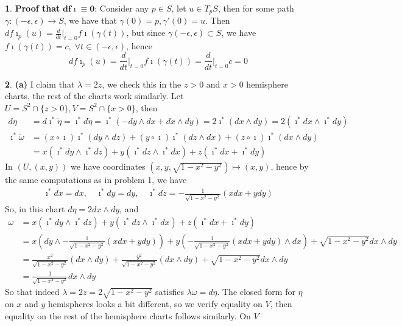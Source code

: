 \documentclass[10.5pt]{article}
\theoremstyle{definition}
\newtheorem{pb}{}
\newcommand{\set}[1]{\{#1\}}
\newcommand{\tand}{\text{ and }}
\newcommand{\z}{\imath}
\begin{document}
\begin{pb}
        \textbf{Proof that} \(\mathbf{df\z \equiv 0}\): Consider any \(p \in S\), let \(u \in T_pS\), then for some path \(\gamma: (-\epsilon,\epsilon) \to S\), we have that \(\gamma(0) = p, \gamma'(0) = u\). Then \(df\z_p(u) = \frac{d}{dt}\vert_{t=0}f\z(\gamma(t))\), but since \(\gamma(-\epsilon,\epsilon) \subset S\), we have \(f\z(\gamma(t)) = c, \; \forall t \in (-\epsilon,\epsilon)\), hence
        \[df\z_p(u) = \frac{d}{dt}\vert_{t=0}f\z(\gamma(t)) = \frac{d}{dt}\vert_{t=0} c = 0\]
    \end{pb}
    \begin{pb}
        \textbf{(a)}
        I claim that \(\lambda = 2z\), we check this in the \(z > 0 \tand x > 0\) hemisphere charts, the rest of the charts work similarly. Let \(U = S^2 \cap \set{z > 0}, V = S^2 \cap \set{x > 0}\), then
        \begin{align*}
            d\eta &= d\z^*\tilde{\eta} = \z^*d\tilde{\eta} = \z^*(-dy\wedge dx + dx \wedge dy) = 2 \z^*(dx\wedge dy) = 2(\z^*dx \wedge \z^*dy) \\
            \z^* \tilde{\omega} &= (x\circ \z)\z^*(dy \wedge dz) + (y\circ \z)\z^*(dz \wedge dx) + (z\circ \z)\z^*(dx \wedge dy) \\
            &= x (\z^* dy \wedge \z^* dz) + y(\z^* dz \wedge \z^*dx) + z(\z^*dx + \z^*dy)
        \end{align*}
        In \((U,(x,y))\) we have coordinates \((x,y,\sqrt{1-x^2-y^2}) \mapsto (x,y)\), hence by the same computations as in problem 1, we have
        \begin{align*}
            \z^*dx = dx, \quad \z^*dy = dy, \quad \z^*dz = -\frac{1}{\sqrt{1-x^2-y^2}}(xdx + ydy)
        \end{align*}
        So, in this chart \(d \eta = 2 dx\wedge dy\), and
        \begin{align*}
            \omega &= x (\z^* dy \wedge \z^* dz) + y(\z^* dz \wedge \z^*dx) + z(\z^*dx + \z^*dy) \\
            &= x (dy \wedge -\frac{1}{\sqrt{1-x^2-y^2}}(xdx + ydy)) + y (-\frac{1}{\sqrt{1-x^2-y^2}}(xdx + ydy) \wedge dx) + \sqrt{1-x^2-y^2}dx \wedge dy \\
            &= \frac{x^2}{\sqrt{1-x^2-y^2}}(dx \wedge dy) + \frac{y^2}{\sqrt{1-x^2-y^2}}(dx \wedge dy) + \sqrt{1-x^2-y^2}dx \wedge dy \\
            &= \frac{1}{\sqrt{1-x^2-y^2}}dx \wedge dy
        \end{align*}
        So that indeed \(\lambda = 2z = 2\sqrt{1 -x^2-y^2}\) satisfies \(\lambda\omega = d\eta\). The closed form for \(\eta\) on \(x\) and \(y\) hemispheres looks a bit different, so we verify equality on \(V\), then equality on the rest of the hemisphere charts follows similarly. On \(V\)

\end{pb}
\end{document}
